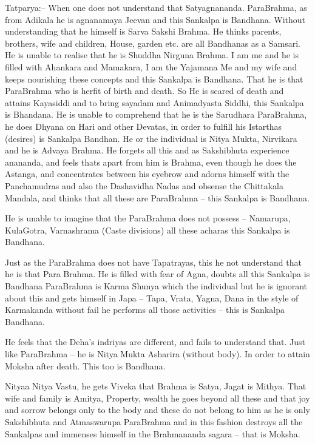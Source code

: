 Tatparya:– When one does not understand that Satyagnananda. ParaBrahma, as from Adikala he is agnanamaya Jeevan and this Sankalpa is Bandhana. Without understanding that he himself is Sarva Sakshi Brahma. He thinks parents, brothers, wife and children, House, garden etc. are all Bandhanas as a Samsari. He is unable to realise that he is Shuddha Nirguna Brahma. I am me and he is filled with Ahankara and Mamakara, I am the Yajamana Me and my wife and keeps nourishing these concepts and this Sankalpa is Bandhana. That he is that ParaBrahma who is herfit of birth and death. So He is scared of death and attains Kayasiddi and to bring sayadam and Animadyasta Siddhi, this Sankalpa is Bhandana. He is unable to comprehend that he is the Sarudhara ParaBrahma, he does Dhyana on Hari and other Devatas, in order to fulfill his Istarthas (desires) is Sankalpa Bandhan. He or the individual is Nitya Mukta, Nirvikara and he is Advaya Brahma. He forgets all this and as Sakshibhuta experience anananda, and feels thats apart from him is Brahma, even though he does the Astanga, and concentrates between his eyebrow and adorns himself with the Panchamudras and also the Dashavidha Nadas and obsense the Chittakala Mandala, and thinks that all these are ParaBrahma – this Sankalpa is Bandhana.

He is unable to imagine that the ParaBrahma does not possess – Namarupa, KulaGotra, Varnashrama (Caste divisions) all these acharas this Sankalpa is Bandhana. 

Just as the ParaBrahma does not have Tapatrayas, this he not understand that he is that Para Brahma. He is filled with fear of Agna, doubts all this Sankalpa is Bandhana ParaBrahma is Karma Shunya which the individual but he is ignorant about this and gets himself in Japa – Tapa, Vrata, Yagna, Dana in the style of Karmakanda without fail he performs all those activities – this is Sankalpa Bandhana.

He feels that the Deha's indriyas are different, and fails to understand that. Just like ParaBrahma – he is Nitya Mukta Asharira (without body). In order to attain Moksha after death. This too is Bandhana.

Nityaa Nitya Vastu, he gets Viveka that Brahma is Satya, Jagat is Mithya. That wife and family is Amitya, Property, wealth he goes beyond all these and that joy and sorrow belongs only to the body and these do not belong to him as he is only Sakshibhuta and Atmaswarupa ParaBrahma and in this fashion destroys all the Sankalpas and immenses himself in the Brahmananda sagara – that is Moksha.


